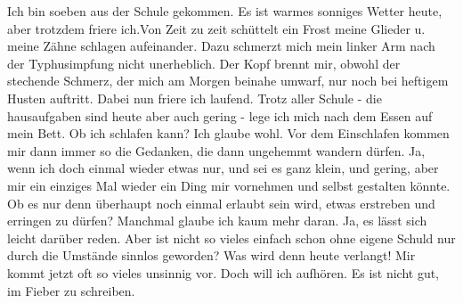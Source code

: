 \def\day{16. Juni 1943.}
\mktitle

Ich bin soeben aus der Schule gekommen.
Es ist warmes sonniges Wetter heute, aber trotzdem friere ich.Von Zeit zu zeit sch\"{u}ttelt ein Frost meine Glieder u. meine Z\"{a}hne schlagen aufeinander.
Dazu schmerzt mich mein linker Arm nach der Typhusimpfung nicht unerheblich.
Der Kopf brennt mir, obwohl der stechende Schmerz, der mich am Morgen beinahe umwarf, nur noch bei heftigem Husten auftritt.
Dabei nun friere ich laufend.
Trotz aller Schule - die hausaufgaben sind heute aber auch gering - lege ich mich nach dem Essen auf mein Bett.
Ob ich schlafen kann?
Ich glaube wohl.
Vor dem Einschlafen kommen mir dann immer so die Gedanken, die dann ungehemmt wandern d\"{u}rfen.
Ja, wenn ich doch einmal wieder etwas nur, und sei es ganz klein, und gering, aber mir ein einziges Mal wieder ein Ding mir vornehmen und selbst gestalten k\"{o}nnte.
Ob es nur denn \"{u}berhaupt noch einmal erlaubt sein wird, etwas erstreben und erringen zu d\"{u}rfen?
Manchmal glaube ich kaum mehr daran.
Ja, es l\"{a}sst sich leicht dar\"{u}ber reden.
Aber ist nicht so vieles einfach schon ohne eigene Schuld nur durch die Umst\"{a}nde sinnlos geworden?
Was wird denn heute verlangt!
Mir kommt jetzt oft so vieles unsinnig vor.
Doch will ich aufh\"{o}ren.
Es ist nicht gut, im Fieber zu schreiben.

\clearpage
